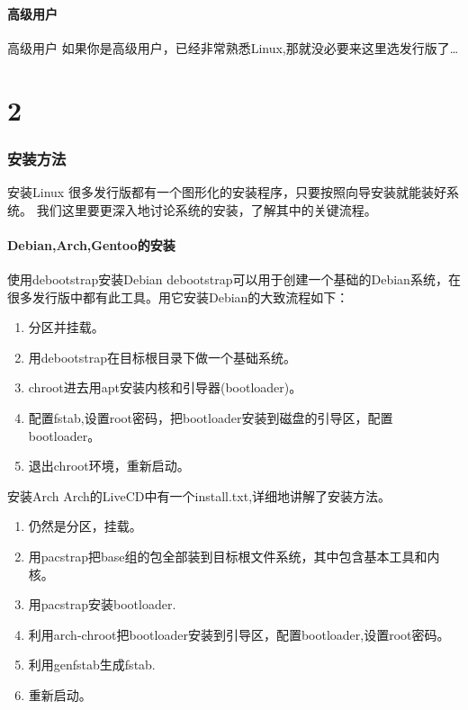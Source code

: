 \documentclass{beamer}
\begin{document}
\subsection{高级用户}
\begin{frame}{高级用户}
如果你是高级用户，已经非常熟悉Linux,那就没必要来这里选发行版了\ldots
\end{frame}

\part{2}
\section{安装方法}
\begin{frame}{安装Linux}
很多发行版都有一个图形化的安装程序，只要按照向导安装就能装好系统。
我们这里要更深入地讨论系统的安装，了解其中的关键流程。
\end{frame}

\subsection{Debian,Arch,Gentoo的安装}
\begin{frame}{使用debootstrap安装Debian}
debootstrap可以用于创建一个基础的Debian系统，在很多发行版中都有此工具。用它安装Debian的大致流程如下：
\begin{enumerate}
\item 分区并挂载。
\item 用debootstrap在目标根目录下做一个基础系统。
\item chroot进去用apt安装内核和引导器(bootloader)。
\item 配置fstab,设置root密码，把bootloader安装到磁盘的引导区，配置bootloader。
\item 退出chroot环境，重新启动。
\end{enumerate}
\end{frame}

\begin{frame}{安装Arch}
Arch的LiveCD中有一个install.txt,详细地讲解了安装方法。
\begin{enumerate}
\item 仍然是分区，挂载。
\item 用pacstrap把base组的包全部装到目标根文件系统，其中包含基本工具和内核。
\item 用pacstrap安装bootloader.
\item 利用arch-chroot把bootloader安装到引导区，配置bootloader,设置root密码。
\item 利用genfstab生成fstab.
\item 重新启动。
\end{enumerate}
\end{frame}
\end{document}
